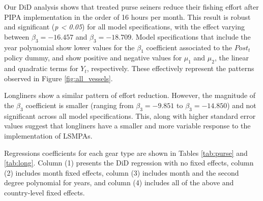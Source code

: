 \documentclass[12pt,]{article}
\begin{document}
Our DiD analysis shows that treated purse seiners reduce their fishing
effort after PIPA implementation in the order of 16 hours per month.
This result is robust and significant (\emph{p \textless{} 0.05}) for
all model specifications, with the effect varying between
\(\beta_3 = -16.457\) and \(\beta_3 = -18.709\). Model specifications
that include the year polynomial show lower values for the \(\beta_1\)
coefficient associated to the \(Post_t\) policy dummy, and show positive
and negative values for \(\mu_1\) and \(\mu_2\), the linear and
quadratic terms for \(Y_t\), respectively. These effectively represent
the patterns observed in Figure \ref{fig:all_vessels}.

Longliners show a similar pattern of effort reduction. However, the
magnitude of the \(\beta_3\) coefficient is smaller (ranging from
\(\beta_3 = -9.851\) to \(\beta_3 = -14.850\)) and not significant
across all model specifications. This, along with higher standard error
values suggest that longliners have a smaller and more variable response
to the implementation of LSMPAs.

Regressions coefficients for each gear type are shown in Tables
\ref{tab:purse} and \ref{tab:long}. Column (1) presents the DiD
regression with no fixed effects, column (2) includes month fixed
effects, column (3) includes month and the second degree polynomial for
years, and column (4) includes all of the above and country-level fixed
effects.
\end{document}
